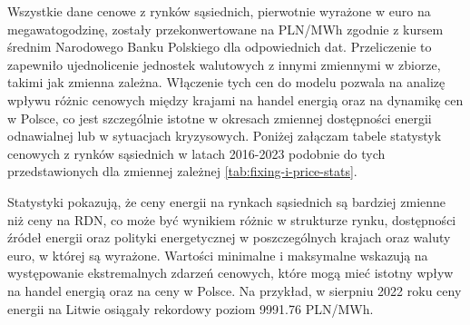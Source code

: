 Wszystkie dane cenowe z rynków sąsiednich, pierwotnie wyrażone w euro na megawatogodzinę, zostały przekonwertowane na PLN/MWh zgodnie z kursem średnim Narodowego Banku Polskiego dla odpowiednich dat. Przeliczenie to zapewniło ujednolicenie jednostek walutowych z innymi zmiennymi w zbiorze, takimi jak zmienna zależna. Włączenie tych cen do modelu pozwala na analizę wpływu różnic cenowych między krajami na handel energią oraz na dynamikę cen w Polsce, co jest szczególnie istotne w okresach zmiennej dostępności energii odnawialnej lub w sytuacjach kryzysowych. Poniżej załączam tabele statystyk cenowych z rynków sąsiednich w latach 2016-2023 podobnie do tych przedstawionych dla zmiennej zależnej \ref{tab:fixing-i-price-stats}.

\begin{table}[H]
    \centering
    \caption{Statystyki cen energii (PLN/MWh) na rynkach sąsiednich w okresie 2016-2023. Opracowanie własne na podstawie danych ENTSO-E.}
    \label{tab:market-price-statistics-full-period}
\end{table}

Statystyki pokazują, że ceny energii na rynkach sąsiednich są bardziej zmienne niż ceny na RDN, co może być wynikiem różnic w strukturze rynku, dostępności źródeł energii oraz polityki energetycznej w poszczególnych krajach oraz waluty euro, w której są wyrażone. Wartości minimalne i maksymalne wskazują na występowanie ekstremalnych zdarzeń cenowych, które mogą mieć istotny wpływ na handel energią oraz na ceny w Polsce. Na przykład, w sierpniu 2022 roku ceny energii na Litwie osiągały rekordowy poziom 9991.76 PLN/MWh.

